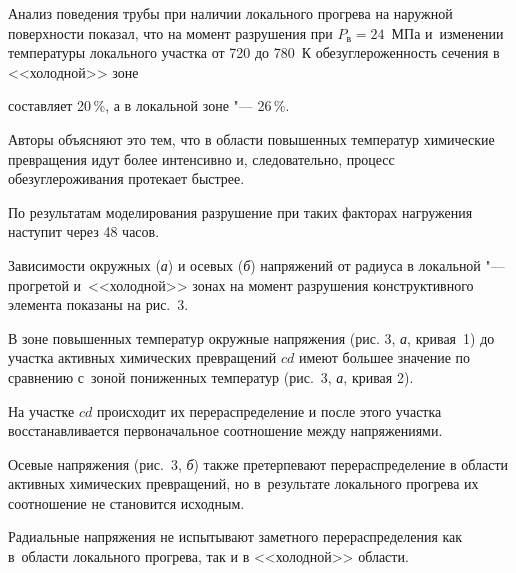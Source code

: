 Анализ поведения трубы при наличии локального прогрева на наружной поверхности показал, что на момент разрушения при $P_\text{в} =24$~МПа и~изменении температуры локального участка от 720 до 780~К обезуглероженность сечения в <<холодной>> зоне

составляет 20\,{\%}, а в локальной зоне "--- 26\,{\%}. 

Авторы  объясняют это тем, что в области повышенных температур химические превращения идут более интенсивно и, следовательно, процесс обезуглероживания протекает быстрее. 

По результатам моделирования разрушение при таких факторах нагружения наступит через 48 часов.

Зависимости окружных ({\sl а}) и осевых ({\sl б}) напряжений от радиуса в локальной "--- прогретой и~<<холодной>> зонах на момент разрушения конструктивного элемента показаны на рис.~3.



В зоне повышенных температур окружные напряжения (рис. 3, {\sl а}, кривая~1) до участка активных химических превращений $cd$ имеют большее значение по сравнению с~зоной пониженных температур (рис.~3, {\sl а}, кривая 2). 

На участке $cd$ происходит их перераспределение и после этого участка восстанавливается первоначальное соотношение между напряжениями.

Осевые напряжения (рис.~3, {\sl б}) также претерпевают перераспределение в области активных химических превращений, но в~результате локального прогрева их соотношение не становится исходным.

Радиальные напряжения не испытывают заметного перераспределения как в~области локального прогрева, так и в <<холодной>> области.



